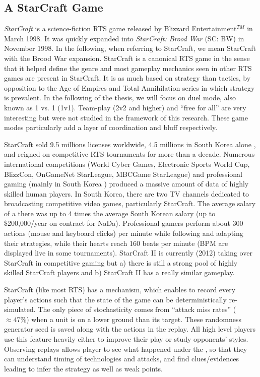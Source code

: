 \subsection{A StarCraft Game}
\textit{StarCraft} is a science-fiction RTS game released by Blizzard Entertainment$^{TM}$ in March 1998. It was quickly expanded into \textit{StarCraft: Brood War} (SC: BW) in November 1998. In the following, when referring to StarCraft, we mean StarCraft with the Brood War expansion. StarCraft is a canonical RTS game in the sense that it helped define the genre and most gameplay mechanics seen in other RTS games are present in StarCraft. It is as much based on strategy than tactics, by opposition to the Age of Empires and Total Annihilation series in which strategy is prevalent. In the following of the thesis, we will focus on duel mode, also known as 1 vs. 1 (1v1). Team-play (2v2 and higher) and ``free for all'' are very interesting but were not studied in the framework of this research. These game modes particularly add a layer of coordination and bluff respectively.


StarCraft sold 9.5 millions licenses worldwide, 4.5 millions in South Korea alone \citep{StarCraftNumbers}, and reigned on competitive RTS tournaments for more than a decade. Numerous international competitions (World Cyber Games, Electronic Sports World Cup, BlizzCon, OnGameNet StarLeague, MBCGame StarLeague) and professional gaming (mainly in South Korea \citep{Chee05}) produced a massive amount of data of highly skilled human players. In South Korea, there are two TV channels dedicated to broadcasting competitive video games, particularly StarCraft. The average salary of a  there was up to 4 times the average South Korean salary \citep{MYMPGM} (up to \$200,000/year on contract for NaDa). Professional gamers perform about 300 actions (mouse and keyboard clicks) per minute while following and adapting their strategies, while their hearts reach 160 beats per minute (BPM are displayed live in some tournaments). StarCraft II is currently (2012) taking over StarCraft in competitive gaming but a) there is still a strong pool of highly skilled StarCraft players and b) StarCraft II has a really similar gameplay.


StarCraft (like most RTS) has a \textit{} mechanism, which enables to record every player's actions such that the state of the game can be deterministically re-simulated. The only piece of stochasticity comes from ``attack miss rates'' ($\approx 47\%$) when a unit is on a lower ground than its target. These randomness generator seed is saved along with the actions in the replay. All high level players use this feature heavily either to improve their play or study opponents' styles. Observing replays allows player to see what happened under the \textit{}, so that they can understand timing of technologies and attacks, and find clues/evidences leading to infer the strategy as well as weak points.


